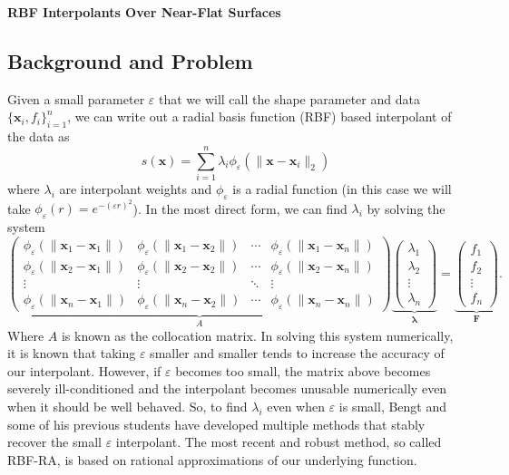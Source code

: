 \documentclass[a4paper,11pt]{article}
\newcommand{\eps}{\varepsilon}
\newcommand{\norm}[1]{\lVert #1 \rVert}
\newcommand{\pmat}[1]{\begin{pmatrix} #1 \end{pmatrix}}
\begin{document}
\begin{center}
	{\Large\textbf{RBF Interpolants Over Near-Flat Surfaces}}
\end{center}

\subsection*{Background and Problem}
Given a small parameter $ \eps $ that we will call the shape parameter and data $ \{\mathbf{x}_i, f_i\}_{i = 1}^n $, we can write out a radial basis function (RBF) based interpolant of the data as
\begin{equation}
	s(\mathbf{x}) = \sum_{i = 1}^n \lambda_i \phi_\eps(\norm{\mathbf{x} - \mathbf{x}_i}_2) \label{func:interp}
\end{equation}
where $ \lambda_i $ are interpolant weights and $ \phi_\eps $ is a radial function (in this case we will take $ \phi_\eps(r) = e^{-(\eps r)^2} $). In the most direct form, we can find $ \lambda_i $ by solving the system
\begin{equation}
	\underbrace{\pmat{
		\phi_\eps (\norm{\mathbf{x}_1 - \mathbf{x}_1}) & \phi_\eps (\norm{\mathbf{x}_1 - \mathbf{x}_2}) & \cdots & \phi_\eps (\norm{\mathbf{x}_1 - \mathbf{x}_n}) \\
		\phi_\eps (\norm{\mathbf{x}_2 - \mathbf{x}_1}) & \phi_\eps (\norm{\mathbf{x}_2 - \mathbf{x}_2}) & \cdots & \phi_\eps (\norm{\mathbf{x}_2 - \mathbf{x}_n}) \\
		\vdots & \vdots & \ddots & \vdots \\
		\phi_\eps (\norm{\mathbf{x}_n - \mathbf{x}_1}) & \phi_\eps (\norm{\mathbf{x}_n - \mathbf{x}_2}) & \cdots & \phi_\eps (\norm{\mathbf{x}_n - \mathbf{x}_n})
	}}_{A} \underbrace{\pmat{
		\lambda_1 \\ \lambda_2 \\ \vdots \\ \lambda_n
	}}_{\pmb{\lambda}} = \underbrace{\pmat{
		f_1 \\ f_2 \\ \vdots \\ f_n
	}}_{\pmb{F}}. \label{equ:direct}
\end{equation}
Where $ A $ is known as the collocation matrix. In solving this system numerically, it is known that taking $ \eps $ smaller and smaller tends to increase the accuracy of our interpolant. However, if $ \eps $ becomes too small, the matrix above becomes severely ill-conditioned and the interpolant becomes unusable numerically even when it should be well behaved. So, to find $ \lambda_i $ even when $ \eps $ is small, Bengt and some of his previous students have developed multiple methods that stably recover the small $ \eps $ interpolant. The most recent and robust method, so called RBF-RA, is based on rational approximations of our underlying function. 
\end{document}
